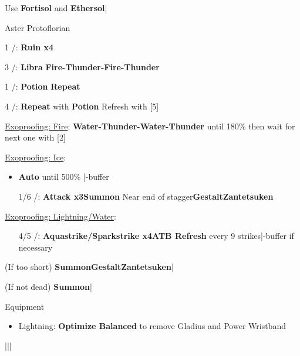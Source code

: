 \begin{mainlist}
	\item Use \textbf{Fortisol} and \textbf{Ethersol}|\skip
\end{mainlist}
\begin{fight}{Aster Protoflorian}
	\item [1] \com/\rav: \textbf{Ruin x4}
	\item [3] \rav/\syn: \textbf{Libra} \to \textbf{Fire-Thunder-Fire-Thunder}
	\item [1] \com/\rav: \textbf{\textbf{Potion}} \to \textbf{Repeat}
	\item [4] \rav/\rav: \textbf{Repeat} with \textbf{Potion} \to Refresh with [5]
	\item \underline{Exoproofing: Fire}: \textbf{Water-Thunder-Water-Thunder} until 180\% then wait for next one with [2]
	\item \underline{Exoproofing: Ice}:
	\begin{itemize}
		\item \textbf{Auto} until 500\% |\com-buffer
		\item [1/6] \com/\rav: \textbf{Attack x3}\to\textbf{Summon} Near end of stagger\to\textbf{Gestalt}\to\textbf{Zantetsuken}
	\end{itemize}
	\item \underline{Exoproofing: Lightning/Water}:
	\begin{itemize}
		\item [4/5] \rav/\rav: \textbf{Aquastrike/Sparkstrike x4}\to\textbf{ATB Refresh} every 9 strikes|\com-buffer if necessary
	\end{itemize}
	\item (If too short) \textbf{Summon}\to\textbf{Gestalt}\to\textbf{Zantetsuken}|\skip
	\item (If not dead) \textbf{Summon}|\skip
\end{fight}
\begin{menu}
	\item Equipment
	\begin{itemize}
		\item Lightning: \textbf{Optimize Balanced} to remove Gladius and Power Wristband
	\end{itemize}
\end{menu}
\begin{mainlist}
	\item \skip|\save||\save
\end{mainlist}

